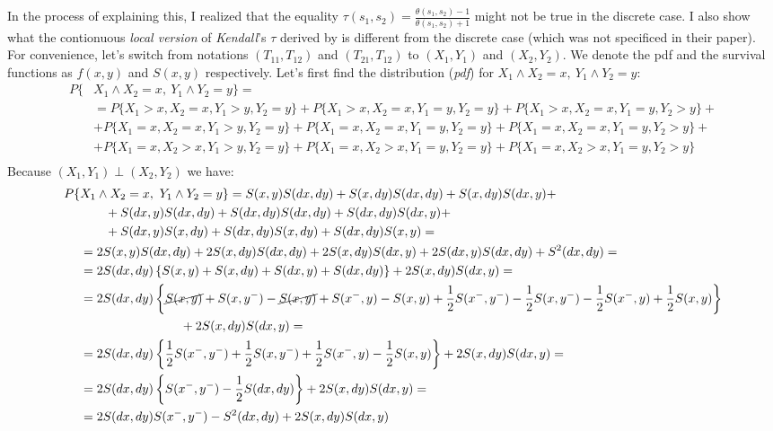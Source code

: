 \documentclass[]{article}
\begin{document}
In the process of explaining this, I realized that the equality $\tau(s_1, s_2) = \frac{\theta(s_1, s_2) - 1}{\theta(s_1, s_2) + 1}$ might not be true in the discrete case. I also show what the contionuous \emph{local version} of \emph{Kendall}'s $\tau$ derived by \cite{fan2000class} is different from the discrete case (which was not specificed in their paper).
~\\
For convenience, let's switch from notations $(T_{11},T_{12})$ and $(T_{21},T_{12})$ to $(X_{1},Y_{1})$ and $(X_{2},Y_{2})$. We denote the pdf and the survival functions as $f(x,y)$ and $S(x,y)$ respectively. Let's first find the distribution (\emph{pdf}) for $X_{1}\wedge X_{2} = x,~Y_{1}\wedge Y_{2} = y$:
  $$
  \begin{aligned}
    P\{ &X_{1}\wedge X_{2} = x,~Y_{1}\wedge Y_{2} = y \} =\\
     &=P\{ X_{1} > x, X_{2} = x, Y_{1} > y, Y_{2} = y \}
      + P\{ X_{1} > x, X_{2} = x, Y_{1}= y, Y_{2} = y \}
        + P\{ X_{1} > x, X_{2} = x, Y_{1}= y, Y_{2} > y \} + \\
     &+P\{ X_{1} = x, X_{2} = x, Y_{1} > y, Y_{2} = y \}
      + P\{ X_{1} = x, X_{2} = x, Y_{1}= y, Y_{2} = y \}
        + P\{ X_{1} = x, X_{2} = x, Y_{1}= y, Y_{2} > y \} + \\
     &+P\{ X_{1} = x, X_{2} > x, Y_{1} > y, Y_{2} = y \}
      + P\{ X_{1} = x, X_{2} > x, Y_{1}= y, Y_{2} = y \}
        + P\{ X_{1} = x, X_{2} > x, Y_{1}= y, Y_{2} > y \}\\
  \end{aligned}
  $$
Because $(X_{1}, Y_{1}) \perp (X_{2}, Y_{2})$ we have:
  $$
  \begin{aligned}
P\{ &X_{1}\wedge X_{2} = x,~Y_{1}\wedge Y_{2} = y \} 
      = S(x,y)S(dx, dy) +  S(x,dy)S(dx, dy) + S(x,dy)S(dx, y) + \\
      &~~~~~~+ S(dx,y)S(dx, dy) +  S(dx,dy)S(dx, dy) + S(dx,dy)S(dx, y) + \\
      &~~~~~~+ S(dx,y)S(x, dy) +  S(dx,dy)S(x, dy) + S(dx,dy)S(x, y) = \\
      &= 2S(x,y)S(dx, dy) +  2S(x,dy)S(dx, dy) + 2S(x,dy)S(dx, y) + 2S(dx,y)S(dx, dy) +  S^2(dx,dy) = \\
      &= 2S(dx, dy)\left\{S(x,y) +  S(x,dy) + S(dx,y) +  S(dx,dy)\right\}  + 2S(x,dy)S(dx, y)= \\
      &= 2S(dx, dy)\left\{\cancel{S(x,y)} +  S(x,y^-) - \cancel{S(x,y)} + S(x^-,y) - S(x,y) +  \frac{1}{2}S(x^-,y^-) - \frac{1}{2}S(x,y^-) - \frac{1}{2}S(x^-,y) + \frac{1}{2}S(x,y)\right\}\\
      &~~~~~~~~~~~~~~~~~~~~~~~~  + 2S(x,dy)S(dx, y)= \\
      &= 2S(dx, dy)\left\{\frac{1}{2}S(x^-,y^-)  + \frac{1}{2}S(x,y^-)  + \frac{1}{2}S(x^-,y) - \frac{1}{2}S(x,y)\right\} + 2S(x,dy)S(dx, y) =\\
      &= 2S(dx, dy)\left\{ S(x^-,y^-) -\frac{1}{2}S(dx,dy)\right\} + 2S(x,dy)S(dx, y) =\\
      &= 2S(dx, dy) S(x^-,y^-) -S^2(dx,dy) + 2S(x,dy)S(dx, y)\\
	\end{aligned}
	$$
\end{document}
